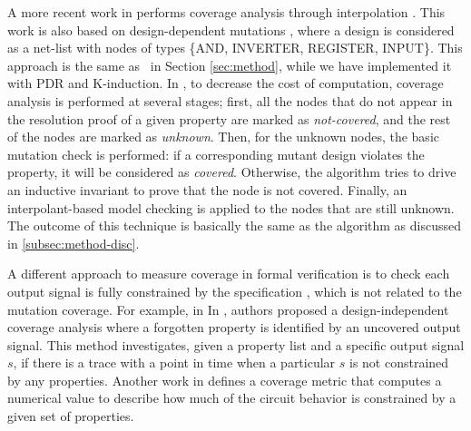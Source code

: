 A more recent work in \cite{chockler2010coverage} performs coverage analysis through interpolation \cite{mcmillan2003interpolation}. This work is also based on design-dependent mutations \cite{chockler_coverage_2003}, where a design is considered as a net-list with nodes of types \{AND, INVERTER, REGISTER, INPUT\}. This approach is the same as \nondetcov\ in Section \ref{sec:method}, while we have implemented it with PDR and K-induction.
In  \cite{chockler2010coverage}, to decrease the cost of computation, coverage analysis is performed at several stages; first, all the nodes that do not appear in the resolution proof of a given property are marked as \emph{not-covered}, and the rest of the nodes are marked as \emph{unknown}. Then, for the unknown nodes, the basic mutation check is performed: if a corresponding mutant design violates the property, it will be considered as \emph{covered}. Otherwise, the algorithm tries to drive an inductive invariant to prove that the node is not covered. Finally, an interpolant-based model checking is applied to the nodes that are still unknown. The outcome of this technique is basically the same as the \mustalg algorithm as discussed in \ref{subsec:method-disc}.

A different approach to measure coverage in formal verification is to check each output signal is fully constrained by the specification \cite{das2005formal, claessen2007coverage, grosse2007estimating}, which is not related to the mutation coverage. For example, in In \cite{claessen2007coverage}, authors proposed a design-independent coverage analysis where a forgotten property is identified by an uncovered output signal. This method investigates, given a property list and a specific output signal $s$, if there is a trace with a point in time when a particular $s$ is not constrained by any properties. Another work in \cite{haedicke2012guiding} defines a coverage metric that computes a numerical value to describe how much of the circuit behavior is constrained by a given set of properties.


